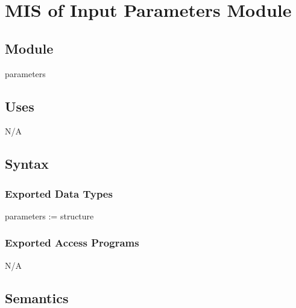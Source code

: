 \documentclass[12pt]{article}
\begin{document}
\section{MIS of Input Parameters Module} \label{Parameters}
\subsection{Module}
parameters
\subsection{Uses}
N/A
\subsection{Syntax}
\subsubsection{Exported Data Types}
parameters := structure
\subsubsection{Exported Access Programs}
N/A
\subsection{Semantics}
\end{document}

